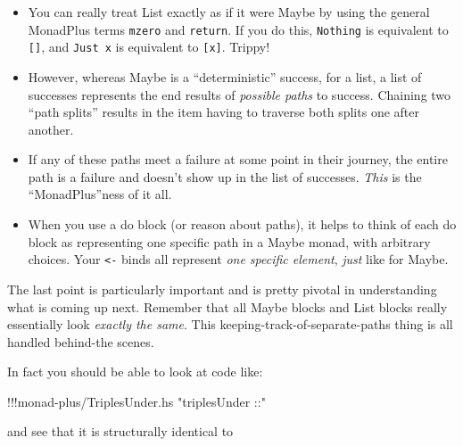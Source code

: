 \documentclass[]{article}
\newenvironment{Shaded}{}{}
\newcommand{\KeywordTok}[1]{\textcolor[rgb]{0.00,0.44,0.13}{\textbf{{#1}}}}
\newcommand{\DataTypeTok}[1]{\textcolor[rgb]{0.56,0.13,0.00}{{#1}}}
\newcommand{\DecValTok}[1]{\textcolor[rgb]{0.25,0.63,0.44}{{#1}}}
\newcommand{\StringTok}[1]{\textcolor[rgb]{0.25,0.44,0.63}{{#1}}}
\newcommand{\OtherTok}[1]{\textcolor[rgb]{0.00,0.44,0.13}{{#1}}}
\newcommand{\FunctionTok}[1]{\textcolor[rgb]{0.02,0.16,0.49}{{#1}}}
\newcommand{\NormalTok}[1]{{#1}}
\begin{document}
\begin{itemize}
\tightlist
\item
  You can really treat List exactly as if it were Maybe by using the
  general MonadPlus terms \texttt{mzero} and \texttt{return}. If you do
  this, \texttt{Nothing} is equivalent to \texttt{{[}{]}}, and
  \texttt{Just\ x} is equivalent to \texttt{{[}x{]}}. Trippy!
\item
  However, whereas Maybe is a ``deterministic'' success, for a list, a
  list of successes represents the end results of \emph{possible paths}
  to success. Chaining two ``path splits'' results in the item having to
  traverse both splits one after another.
\item
  If any of these paths meet a failure at some point in their journey,
  the entire path is a failure and doesn't show up in the list of
  successes. \emph{This} is the ``MonadPlus''ness of it all.
\item
  When you use a do block (or reason about paths), it helps to think of
  each do block as representing one specific path in a Maybe monad, with
  arbitrary choices. Your \texttt{\textless{}-} binds all represent
  \emph{one specific element}, \emph{just} like for Maybe.
\end{itemize}

The last point is particularly important and is pretty pivotal in
understanding what is coming up next. Remember that all Maybe blocks and
List blocks really essentially look \emph{exactly the same}. This
keeping-track-of-separate-paths thing is all handled behind-the scenes.

In fact you should be able to look at code like:

\begin{Shaded}
\begin{Highlighting}[]
\FunctionTok{!!!}\NormalTok{monad}\FunctionTok{-}\NormalTok{plus}\FunctionTok{/}\NormalTok{TriplesUnder.hs }\StringTok{"triplesUnder ::"}
\end{Highlighting}
\end{Shaded}

and see that it is structurally identical to

\begin{Shaded}
\end{Shaded}
\end{document}

